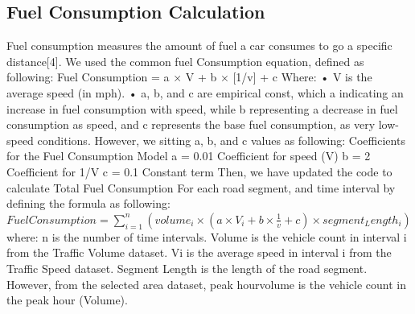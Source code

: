 \subsection{Fuel Consumption Calculation}
Fuel consumption measures the amount of fuel a car consumes to go a specific distance[4]. 
We used the common fuel Consumption equation, defined as following:
\newline
\newline
Fuel Consumption = a × V + b × [1/v] + c
\newline
\newline
Where: 
\newline
\newline
• V is the average speed (in mph). 
\newline
• a, b, and c are empirical const, which a indicating an increase in fuel consumption with speed, while b representing a decrease in fuel consumption as speed, and c represents the base fuel consumption, as very low-speed conditions.
\newline
\newline
However, we sitting a, b, and c values as following:
\newline
Coefficients for the Fuel Consumption Model
\newline a = 0.01  Coefficient for speed (V)
\newline b = 2  Coefficient for 1/V
\newline c = 0.1  Constant term
Then, we have updated the code to calculate Total Fuel Consumption For each road segment, and time interval by defining the formula as following:
\newline
$Fuel Consumption=\sum_{i=1}^{n}  (volume_{i} \times (a×V_{i}+b×\frac{1}{v}+c)\times segment_Length_{i})$
\newline
\newline
where:
\newline n is the number of time intervals. 
\newline Volume is the vehicle count in interval i from the Traffic Volume dataset. 
\newline Vi is the average speed in interval i from the Traffic Speed dataset. 
\newline Segment Length is the length of the road segment.
\newline
\newline
However, from the selected area dataset, 
\newline
peak hourvolume is the vehicle count in the peak hour (Volume).
\newline
